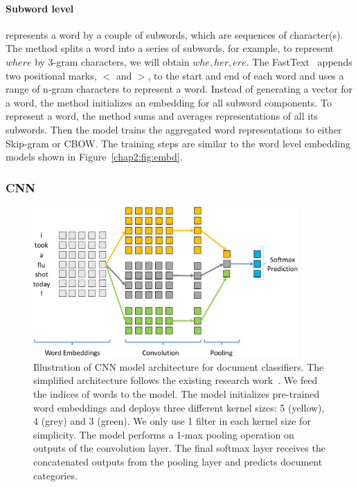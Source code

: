 
\paragraph{Subword level} represents a word by a couple of subwords, which are sequences of character(s).
The method splits a word into a series of subwords, for example, to represent $where$ by 3-gram characters, we will obtain $whe, her, ere$.
The FastText~\cite{bojanowski2017enriching} appends two positional marks, $<$ and $>$, to the start and end of each word and uses a range of n-gram characters to represent a word. 
Instead of generating a vector for a word, the method initializes an embedding for all subword components.
To represent a word, the method sums and averages representations of all its subwords.
Then the model trains the aggregated word representations to either Skip-gram or CBOW.
The training steps are similar to the word level embedding models shown in Figure~\ref{chap2:fig:embd}.


\subsubsection{CNN}

\begin{figure}[t!]
\centering
\includegraphics[width=0.90\textwidth]{images/chapter2/cnn.pdf}
\caption{Illustration of CNN model architecture for document classifiers. The simplified architecture follows the existing research work~\cite{kim2014convolutional}. We feed the indices of words to the model. The model initializes pre-trained word embeddings and deploys three different kernel sizes: 5 (yellow), 4 (grey) and 3 (green). We only use 1 filter in each kernel size for simplicity. The model performs a 1-max pooling operation on outputs of the convolution layer. The final softmax layer receives the concatenated outputs from the pooling layer and predicts document categories.}
\label{chap2:fig:cnn}
\end{figure}


